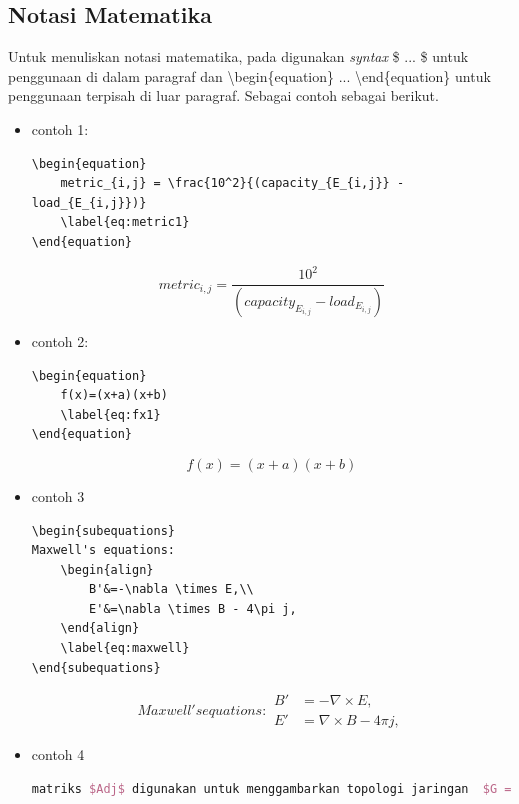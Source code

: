 \subsection{Notasi Matematika}
Untuk menuliskan notasi matematika, pada \latex digunakan \textit{syntax} \$ ... \$ untuk penggunaan di dalam paragraf dan \textbackslash begin\{equation\} ... \textbackslash end\{equation\} untuk penggunaan terpisah di luar paragraf. Sebagai contoh sebagai berikut.
\begin{itemize}
\item contoh 1:
\begin{lstlisting}
\begin{equation}
	metric_{i,j} = \frac{10^2}{(capacity_{E_{i,j}} - 	load_{E_{i,j}})}
	\label{eq:metric1}
\end{equation}
\end{lstlisting}
\begin{equation}
	metric_{i,j} = \frac{10^2}{(capacity_{E_{i,j}} - 	load_{E_{i,j}})}
	\label{eq:metric1}
\end{equation}
\item contoh 2:
\begin{lstlisting}
\begin{equation}
	f(x)=(x+a)(x+b)
	\label{eq:fx1}
\end{equation}
\end{lstlisting}
\begin{equation}
	f(x)=(x+a)(x+b)
	\label{eq:fx1}
\end{equation}
\item contoh 3
\begin{lstlisting}
\begin{subequations}
Maxwell's equations:
	\begin{align}
		B'&=-\nabla \times E,\\
		E'&=\nabla \times B - 4\pi j,
	\end{align}
	\label{eq:maxwell}
\end{subequations}
\end{lstlisting}
\begin{subequations}
Maxwell's equations:
	\begin{align}
		B'&=-\nabla \times E,\\
		E'&=\nabla \times B - 4\pi j,
	\end{align}
	\label{eq:maxwell}
\end{subequations}
\item contoh 4
\begin{lstlisting}[language=tex]
matriks $Adj$ digunakan untuk menggambarkan topologi jaringan  $G = (V,E)$, di mana $V = \{v_{1}, v_{2}, ..., v_{n}\}$ merupakan \textit{switch} dan $E = \{e_{1,1}, e_{1,2}, ..., e_{n,n}\}$ merupakan \textit{link} antar-\textit{switch}. Setiap $E_{i,j}$ menyimpan informasi \textit{metric} sesuai persamaan \ref{eq:metric1} . Hasil dari algoritma ini adalah jalur $T_{k,l}$ yang disimpan di dalam \textit{bucket Path} atau $T$. Setiap $T_{k,l}$ mempunyai nilai \textit{metric} sesuai persamaan \ref{eq:metric2}.

\end{lstlisting}
\end{itemize}
